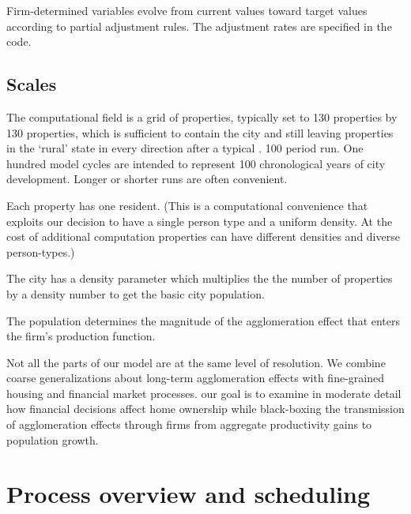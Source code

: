 Firm-determined variables evolve from current values toward target values according to partial adjustment rules. The adjustment rates are specified in the code.  

                
\subsection{Scales}

The computational field is a grid of properties, typically set to 130 properties by 130 properties, which is sufficient to contain the city and still leaving properties in the `rural' state in every direction after a typical .
100 period run. One hundred model cycles are intended to represent 100 chronological years of city development. Longer or shorter runs are often convenient. 

Each property has one resident. (This is a computational convenience that exploits our decision to have a single person type and a uniform density. At the cost of additional computation properties can have different densities and diverse person-types.) 

The city has a density parameter which multiplies the the number of properties by a density number to get the basic city population. 

The population determines the magnitude of the agglomeration effect that enters the firm's production function.

Not all the parts of our model are at the same level of resolution. We combine coarse generalizations about long-term agglomeration effects with fine-grained housing and financial market processes. our goal is to examine in moderate detail how financial decisions affect home ownership while black-boxing the transmission of agglomeration effects through firms from aggregate productivity gains to population growth. 





\section{Process overview and scheduling}

